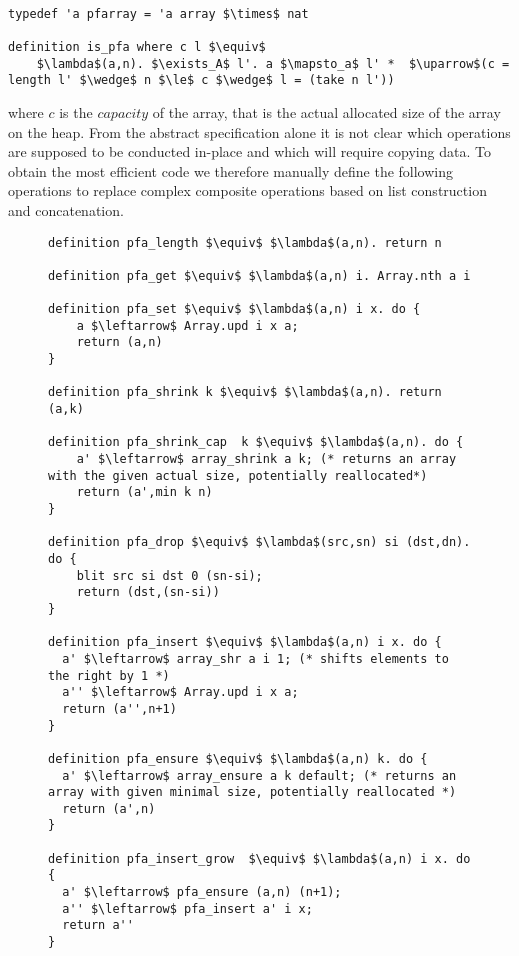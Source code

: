 \begin{lstlisting}[mathescape=true, language=Isabelle]

typedef 'a pfarray = 'a array $\times$ nat

definition is_pfa where c l $\equiv$
    $\lambda$(a,n). $\exists_A$ l'. a $\mapsto_a$ l' *  $\uparrow$(c = length l' $\wedge$ n $\le$ c $\wedge$ l = (take n l'))
\end{lstlisting}

where $c$ is the $capacity$ of the array, that is the actual allocated size
of the array on the heap.
From the abstract specification alone
it is not clear which operations are supposed to be conducted
in-place and which will require copying data.
To obtain the most efficient code we therefore manually
define the following operations to replace complex composite
operations based on list construction and concatenation.

\begin{figure}
\begin{lstlisting}[mathescape=true, language=Isabelle,label={lst:pfarray-def},
    caption={Important Partially Filled Array functions for Insertion.}]
definition pfa_length $\equiv$ $\lambda$(a,n). return n

definition pfa_get $\equiv$ $\lambda$(a,n) i. Array.nth a i

definition pfa_set $\equiv$ $\lambda$(a,n) i x. do {
    a $\leftarrow$ Array.upd i x a;
    return (a,n)
}

definition pfa_shrink k $\equiv$ $\lambda$(a,n). return (a,k)

definition pfa_shrink_cap  k $\equiv$ $\lambda$(a,n). do {
    a' $\leftarrow$ array_shrink a k; (* returns an array with the given actual size, potentially reallocated*)
    return (a',min k n)
}

definition pfa_drop $\equiv$ $\lambda$(src,sn) si (dst,dn). do {
    blit src si dst 0 (sn-si);
    return (dst,(sn-si))
}

definition pfa_insert $\equiv$ $\lambda$(a,n) i x. do {
  a' $\leftarrow$ array_shr a i 1; (* shifts elements to the right by 1 *)
  a'' $\leftarrow$ Array.upd i x a;
  return (a'',n+1)
}

definition pfa_ensure $\equiv$ $\lambda$(a,n) k. do {
  a' $\leftarrow$ array_ensure a k default; (* returns an array with given minimal size, potentially reallocated *)
  return (a',n)
}

definition pfa_insert_grow  $\equiv$ $\lambda$(a,n) i x. do {
  a' $\leftarrow$ pfa_ensure (a,n) (n+1);
  a'' $\leftarrow$ pfa_insert a' i x;
  return a''
}
\end{lstlisting}
\end{figure}

